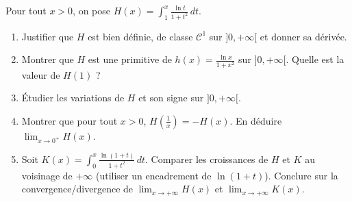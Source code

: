 \documentclass[11pt]{article}
\begin{document}
\begin{exercice}
Pour tout $x > 0$, on pose $\displaystyle H(x) = \int_1^x \frac{\ln t}{1+t^2} \, dt$.
\begin{enumerate}
    \item Justifier que $H$ est bien définie, de classe $\mathcal{C}^1$ sur $]0, +\infty[$ et donner sa dérivée.
    \item Montrer que $H$ est une primitive de $h(x) = \frac{\ln x}{1+x^2}$ sur $]0, +\infty[$. Quelle est la valeur de $H(1)$ ?
    \item Étudier les variations de $H$ et son signe sur $]0, +\infty[$.
    \item Montrer que pour tout $x > 0$, $H\left(\frac{1}{x}\right) = -H(x)$. En déduire $\lim_{x \to 0^+} H(x)$.
    \item Soit $K(x) = \int_0^x \frac{\ln(1+t)}{1+t^2} \, dt$. Comparer les croissances de $H$ et $K$ au voisinage de $+\infty$ (utiliser un encadrement de $\ln(1+t)$). Conclure sur la convergence/divergence de $\lim_{x \to +\infty} H(x)$ et $\lim_{x \to +\infty} K(x)$.
\end{enumerate}
\end{exercice}
\end{document}

